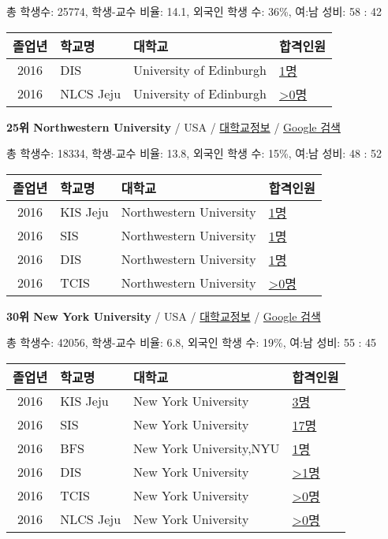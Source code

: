 \documentclass[13pt,]{article}
\begin{document}
총 학생수: 25774, 학생-교수 비율: 14.1, 외국인 학생 수: 36\%, 여:남
성비: 58 : 42

\begin{longtable}[]{@{}clll@{}}
\toprule
졸업년 & 학교명 & 대학교 & 합격인원\tabularnewline
\midrule
\endhead
2016 & DIS & University of Edinburgh &
\href{http://cafe.naver.com/assarabia/11591}{1명}\tabularnewline
2016 & NLCS Jeju & University of Edinburgh &
\href{http://cafe.naver.com/assarabia/11592}{\textgreater{}0명}\tabularnewline
\bottomrule
\end{longtable}

\textbf{25위 Northwestern University} / USA /
\href{https://www.timeshighereducation.com/world-university-rankings/northwestern-university?ranking-dataset=133819}{대학교정보}
/ \href{http://www.google.com/search?q=Northwestern+University}{Google
검색}

총 학생수: 18334, 학생-교수 비율: 13.8, 외국인 학생 수: 15\%, 여:남
성비: 48 : 52

\begin{longtable}[]{@{}clll@{}}
\toprule
졸업년 & 학교명 & 대학교 & 합격인원\tabularnewline
\midrule
\endhead
2016 & KIS Jeju & Northwestern University &
\href{http://cafe.naver.com/assarabia/11596}{1명}\tabularnewline
2016 & SIS & Northwestern University &
\href{http://cafe.naver.com/assarabia/11589}{1명}\tabularnewline
2016 & DIS & Northwestern University &
\href{http://cafe.naver.com/assarabia/11591}{1명}\tabularnewline
2016 & TCIS & Northwestern University &
\href{http://cafe.naver.com/assarabia/11598}{\textgreater{}0명}\tabularnewline
\bottomrule
\end{longtable}

\textbf{30위 New York University} / USA /
\href{https://www.timeshighereducation.com/world-university-rankings/new-york-university?ranking-dataset=133819}{대학교정보}
/ \href{http://www.google.com/search?q=New+York+University}{Google 검색}

총 학생수: 42056, 학생-교수 비율: 6.8, 외국인 학생 수: 19\%, 여:남 성비:
55 : 45

\begin{longtable}[]{@{}clll@{}}
\toprule
졸업년 & 학교명 & 대학교 & 합격인원\tabularnewline
\midrule
\endhead
2016 & KIS Jeju & New York University &
\href{http://cafe.naver.com/assarabia/11596}{3명}\tabularnewline
2016 & SIS & New York University &
\href{http://cafe.naver.com/assarabia/11589}{17명}\tabularnewline
2016 & BFS & New York University,NYU &
\href{http://cafe.naver.com/assarabia/11597}{1명}\tabularnewline
2016 & DIS & New York University &
\href{http://cafe.naver.com/assarabia/11591}{\textgreater{}1명}\tabularnewline
2016 & TCIS & New York University &
\href{http://cafe.naver.com/assarabia/11598}{\textgreater{}0명}\tabularnewline
2016 & NLCS Jeju & New York University &
\href{http://cafe.naver.com/assarabia/11592}{\textgreater{}0명}\tabularnewline
\bottomrule
\end{longtable}
\end{document}
